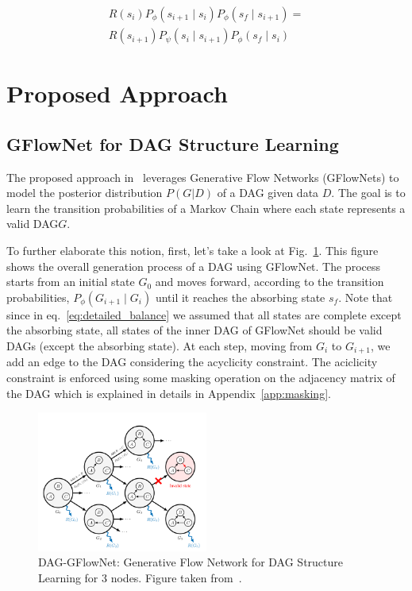 \documentclass{lxaiproposal}
\begin{document}
    \begin{equation}
        \begin{aligned}
            R(s_i) P_{\phi}(s_{i+1} \mid s_i)P_{\phi}(s_f \mid s_{i+1})=\\
            R(s_{i+1}) P_{\psi}(s_i \mid s_{i+1})P_{\phi}(s_f \mid s_i)
        \end{aligned}
        \label{eq:detailed_balance}
    \end{equation}


    \section{Proposed Approach}\label{sec:proposed_approach}

    \subsection{GFlowNet for DAG Structure Learning}

    The proposed approach in~\cite{deleu2022daggflownet} leverages Generative Flow Networks (GFlowNets) to model the
    posterior distribution $P(G|D)$ of a DAG given data $D$. The goal is to learn the transition probabilities of a
    Markov Chain where each state represents a valid DAG$G$.

    To further elaborate this notion, first, let's take a look at Fig.~\ref{fig:dag_gflownet}. This figure shows the
    overall generation process of a DAG using GFlowNet. The process starts from an initial state $G_0$ and moves
    forward, according to the transition probabilities, $P_{\phi}(G_{i+1} \mid G_i)$ until it reaches the absorbing state
    $s_f$. Note that since in eq.~\eqref{eq:detailed_balance} we assumed that all states are complete except the
    absorbing state, all states of the inner DAG of GFlowNet should be valid DAGs (except the absorbing state).
    At each step, moving from $G_i$ to $G_{i+1}$, we add an edge to the DAG considering the acyclicity constraint.
    The aciclicity constraint is enforced using some masking operation on the adjacency matrix of the DAG which is
    explained in details in Appendix~\ref{app:masking}.


    \begin{figure}[h]
        \centering
        \includegraphics[width=0.5\textwidth]{figures/dag_gflownet}
        \caption{DAG-GFlowNet: Generative Flow Network for DAG Structure Learning for 3 nodes. Figure taken from~\cite{deleu2022daggflownet}.}
        \label{fig:dag_gflownet}
    \end{figure}
\end{document}
